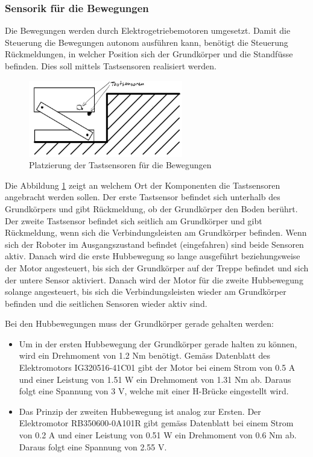 \subsubsection{Sensorik für die Bewegungen}
Die Bewegungen werden durch Elektrogetriebemotoren umgesetzt. Damit die Steuerung die Bewegungen autonom ausführen kann, benötigt die Steuerung Rückmeldungen, in welcher Position sich der Grundkörper und die Standfüsse befinden. Dies soll mittels Tastsensoren realisiert werden.

\begin{figure}[h]
  \includegraphics[width=0.6\textwidth]{img/Treppensteigen/Sensoren_Treppensteigen2.png}
  \centering
  \caption{Platzierung der Tastsensoren für die Bewegungen}
  \label{fig2}
\end{figure}

Die Abbildung \ref{fig2} zeigt an welchem Ort der Komponenten die Tastsensoren angebracht werden sollen. Der erste Tastsensor befindet sich unterhalb des Grundkörpers und gibt Rückmeldung, ob der Grundkörper den Boden berührt. Der zweite Tastsensor befindet sich seitlich am Grundkörper und gibt Rückmeldung, wenn sich die Verbindungsleisten am Grundkörper befinden. Wenn sich der Roboter im Ausgangszustand befindet (eingefahren) sind beide Sensoren aktiv. Danach wird die erste Hubbewegung so lange ausgeführt beziehungsweise der Motor angesteuert, bis sich der Grundkörper auf der Treppe befindet und sich der untere Sensor aktiviert. Danach wird der Motor für die zweite  Hubbewegung solange angesteuert, bis sich die Verbindungsleisten wieder am Grundkörper befinden und die seitlichen Sensoren wieder aktiv sind.


Bei den Hubbewegungen muss der Grundkörper gerade gehalten werden:
\begin{itemize}
    \item Um in der ersten Hubbewegung der Grundkörper gerade halten zu können, wird ein Drehmoment von 1.2 Nm benötigt. Gemäss Datenblatt des Elektromotors IG320516-41C01 gibt der Motor bei einem Strom von 0.5 A und einer Leistung von 1.51 W ein Drehmoment von 1.31 Nm ab. Daraus folgt eine Spannung von 3 V, welche mit einer H-Brücke eingestellt wird.
    \item Das Prinzip der zweiten Hubbewegung ist analog zur Ersten. Der Elektromotor RB350600-0A101R gibt gemäss Datenblatt bei einem Strom von 0.2 A und einer Leistung von 0.51 W ein Drehmoment von 0.6 Nm ab. Daraus folgt eine Spannung von 2.55 V.
 \end{itemize}


